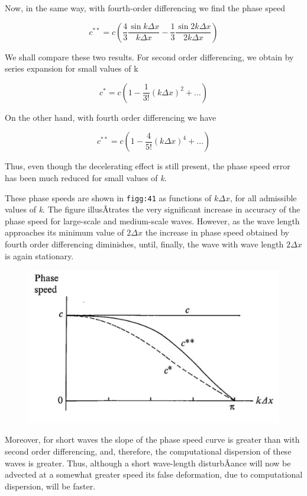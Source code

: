 Now, in the same way, with fourth-order differencing we find the phase
speed

{\[c^{**} = c\left( \frac{4}{3}\frac{\sin{k\Delta x}}{k \Delta x}
- \frac{1}{3}\frac{\sin{2k\Delta x}}{2k\Delta x} \right)\]}

We shall compare these two results. For second order differencing, we
obtain by series expansion for small values of k

\[c^{*} = c\left( 1 - \frac{1}{3!}\left( k\Delta x \right)^{2} + \ldots \right)\]

On the other hand, with fourth order differencing we have

\[c^{**} = c\left( 1 - \frac{4}{5!}\left( k\Delta x \right)^{4} + \ldots \right)\]

Thus, even though the decelerating effect is still present, the phase
speed error has been much reduced for small values of \emph{k}.

These phase speeds are shown in \texttt{figg:41} as functions of
\(k\Delta x\), for all admissible values of \emph{k}. The figure
illusÂ­trates the very significant increase in accuracy of the phase
speed for large-scale and medium-scale waves. However, as the wave
length approaches its minimum value of \(2\Delta x\) the increase in
phase speed obtained by fourth order differencing diminishes, until,
finally, the wave with wave length \(2\Delta x\) is again stationary.

\begin{figure}
\centering
\includegraphics[keepaspectratio]{figs/NM/pic41.jpg}
\caption{} \label{fig:}
\end{figure}

Moreover, for short waves the slope of the phase speed curve is greater
than with second order differencing, and, therefore, the computational
dispersion of these waves is greater. Thus, although a short wave-length
disturbÂ­ance will now be advected at a somewhat greater speed its false
deformation, due to computational dispersion, will be faster.

